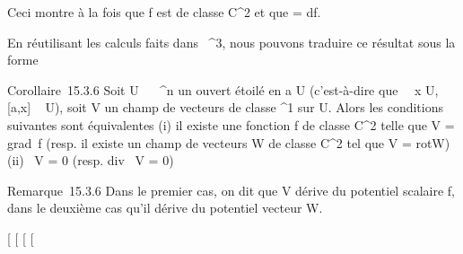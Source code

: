 \documentclass[]{article}
\begin{document}
Ceci montre à la fois que f est de classe C^2 et que \omega = df.

En réutilisant les calculs faits dans ~^3, nous pouvons
traduire ce résultat sous la forme

Corollaire~15.3.6 Soit U \subset~ ~^n un ouvert étoilé en a \in U
(c'est-à-dire que \forall~~x \in U, [a,x] \subset~ U), soit
V un champ de vecteurs de classe ^1 sur U. Alors les
conditions suivantes sont équivalentes (i) il existe une fonction f de
classe C^2 telle que V = grad~f
(resp. il existe un champ de vecteurs W de classe C^2 tel que
V = rotW) (ii) \rot~V
= 0 (resp. div~ V = 0)

Remarque~15.3.6 Dans le premier cas, on dit que V dérive du potentiel
scalaire f, dans le deuxième cas qu'il dérive du potentiel vecteur W.

[
[
[
[
\end{document}
